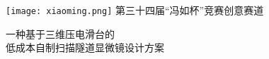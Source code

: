 \documentclass{article}
\begin{document}
\def\Fengru{第三十四届“冯如杯”竞赛创意赛道\\}
\vspace{32pt}
\begin{center}
	\texttt{[image: xiaoming.png]}
	\vskip 6pt
	\xiaoer
	\zhongsong
	第三十四届“冯如杯”竞赛创意赛道
\end{center}
\vspace{12pt}
\begin{spacing}{3}
	\begin{center} 
		\erhao
		\zhongsong
		一种基于三维压电滑台的\\低成本自制扫描隧道显微镜设计方案
	\end{center}
\end{spacing}






\renewcommand{\headrulewidth}{0pt}	%
\clearpage
{}	%
\end{document}
